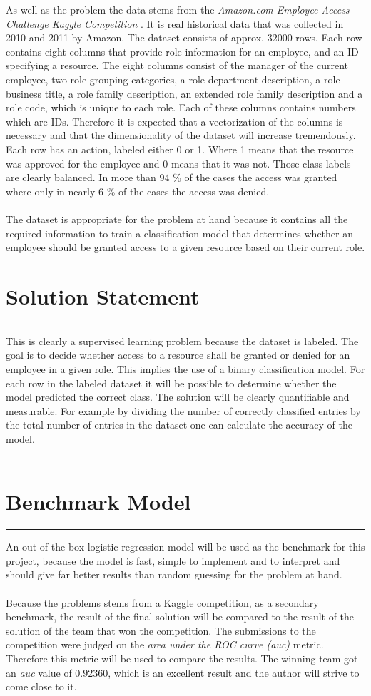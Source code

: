 \documentclass[11pt]{article}
\def\sectionheader#1{\section*{#1}\vskip -0.3cm\hrule\vskip 0.3cm}
\begin{document}
As well as the problem the data stems from the {\it Amazon.com Employee Access Challenge 
Kaggle Competition} \cite{kaggleAmazon}. It is real historical data that was collected in 
2010 and 2011 by Amazon. The dataset consists of approx. 32000 rows. Each row contains
eight columns that provide role information for an employee, and an ID specifying a resource. 
The eight columns consist of the manager of the current employee, two role grouping categories,
a role department description, a role business title, a role family description, an
extended role family description and a role code, which is unique to each role. Each of these
columns contains numbers which are IDs. Therefore it is expected that a vectorization of 
the columns is necessary and that the dimensionality of the dataset will increase tremendously.
Each row has an action, labeled either 0 or 1. Where 1 means that the resource was 
approved for the employee and 0 means that it was not. Those class labels are clearly balanced. 
In more than 94 \% of the cases the access was granted where only in nearly 6 \% of the cases 
the access was denied.
\\ \\
The dataset is appropriate for the problem at hand because it contains all the required 
information to train a classification model that determines whether an employee should be 
granted access to a given resource based on their current role.

\sectionheader{Solution Statement}

This is clearly a supervised learning problem because the dataset is labeled.
The goal is to decide whether access to a resource shall be granted or denied for 
an employee in a given role. This implies the use of a binary classification model. 
For each row in the labeled dataset it will be possible to determine whether the model 
predicted the correct class. The solution will be clearly quantifiable and measurable. 
For example by dividing the number of correctly classified entries by the total number 
of entries in the dataset one can calculate the accuracy of the model.
\\ \\
\sectionheader{Benchmark Model}
An out of the box logistic regression model will be used as the benchmark for this project,
because the model is fast, simple to implement and to interpret and should give far better
results than random guessing for the problem at hand.
\\ \\
Because the problems stems from a Kaggle competition, as a secondary benchmark, the result of 
the final solution will be compared to the result of the solution of the team that won the competition. 
The submissions to the competition were judged on the {\it area under the ROC curve (auc)} metric. 
Therefore this metric will be used to compare the results. The winning team got an {\it auc} value 
of $0.92360$, which is an excellent result and the author will strive to come close to it.
\end{document}
